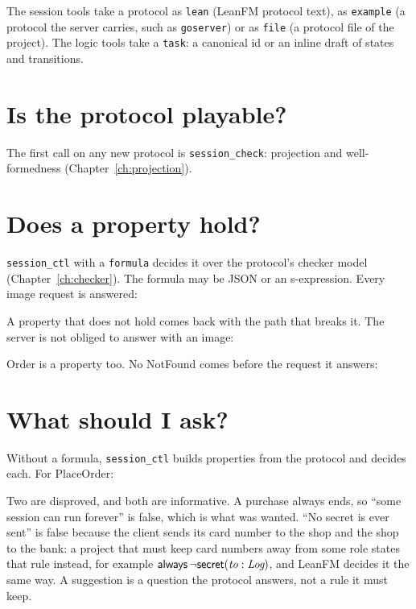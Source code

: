 The session tools take a protocol as \texttt{lean} (LeanFM protocol text), as
\texttt{example} (a protocol the server carries, such as \texttt{goserver}) or as
\texttt{file} (a protocol file of the project). The logic tools take a \texttt{task}:
a canonical id or an inline draft of states and transitions.

\section{Is the protocol playable?}

The first call on any new protocol is \texttt{session\_check}: projection and
well-formedness (Chapter~\ref{ch:projection}).


\section{Does a property hold?}

\texttt{session\_ctl} with a \texttt{formula} decides it over the protocol's checker
model (Chapter~\ref{ch:checker}). The formula may be JSON or an s-expression. Every
image request is answered:


A property that does not hold comes back with the path that breaks it. The server is
not obliged to answer with an image:


Order is a property too. No NotFound comes before the request it answers:


\section{What should I ask?}

Without a formula, \texttt{session\_ctl} builds properties from the protocol and decides
each. For PlaceOrder:


Two are disproved, and both are informative. A purchase always ends, so ``some session
can run forever'' is false, which is what was wanted. ``No secret is ever sent'' is
false because the client sends its card number to the shop and the shop to the bank: a
project that must keep card numbers away from some role states that rule instead, for
example $\mathsf{always}\,\neg\mathsf{secret}(\textit{to}: \textit{Log})$, and LeanFM decides it the
same way. A suggestion is a question the protocol answers, not a rule it must keep.

